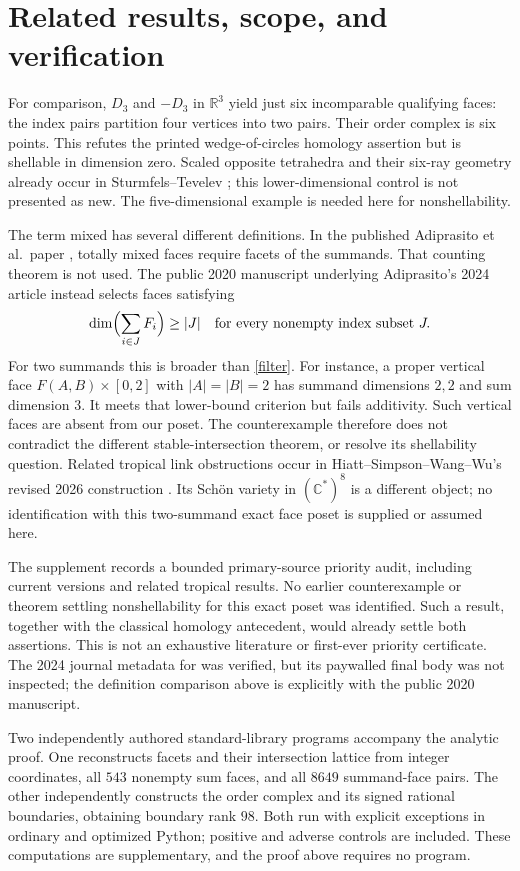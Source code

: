 \documentclass[11pt]{article}
\newcommand{\R}{\mathbb R}
\newcommand{\dimn}{\operatorname{dim}}
\begin{document}
\section{Related results, scope, and verification}
For comparison, $D_3$ and $-D_3$ in $\R^3$ yield just six incomparable
qualifying faces: the index pairs partition four vertices into two
pairs. Their order complex is six points. This refutes the printed
wedge-of-circles homology assertion but is shellable in dimension zero.
Scaled opposite tetrahedra and their six-ray geometry already occur
in Sturmfels--Tevelev \cite[Examples~1.3 and 4.10]{ST}; this lower-dimensional control is not presented as new.
The five-dimensional example is needed here for nonshellability.

The term mixed has several different definitions. In the published
Adiprasito et al.\ paper \cite[Section~1.2]{AB}, totally mixed faces
require facets of the summands. That counting theorem is not used.
The public 2020 manuscript underlying Adiprasito's 2024 article
\cite[p.~2, Corollary~1.3 of the public manuscript]{A} instead selects
faces satisfying
\[
 \dimn\Bigl(\sum_{i\in J}F_i\Bigr)\ge |J|
 \quad\text{for every nonempty index subset }J.
\]
For two summands this is broader than \eqref{filter}.
For instance, a proper vertical face $F(A,B)\times[0,2]$ with
$|A|=|B|=2$ has summand dimensions $2,2$ and sum dimension $3$.
It meets that lower-bound criterion but fails additivity. Such
vertical faces are absent from our poset. The counterexample therefore
does not contradict the different stable-intersection theorem, or
resolve its shellability question.
Related tropical link obstructions occur in Hiatt--Simpson--Wang--Wu's
revised 2026 construction \cite[Section~8]{HSWW}. Its Sch\"on variety
in $(\mathbb C^*)^8$ is a different object; no identification with
this two-summand exact face poset is supplied or assumed here.

The supplement records a bounded primary-source priority audit,
including current versions and related tropical results. No earlier counterexample or theorem settling nonshellability for
this exact poset was identified. Such a result, together with the
classical homology antecedent, would already settle both assertions. This is not an exhaustive
literature or first-ever priority certificate. The 2024 journal
metadata for \cite{A} was verified, but its paywalled final body was
not inspected; the definition comparison above is explicitly with
the public 2020 manuscript.

Two independently authored standard-library programs accompany the
analytic proof. One reconstructs facets and their intersection lattice
from integer coordinates, all $543$ nonempty sum faces, and all $8649$
summand-face pairs. The other independently constructs the order complex
and its signed rational boundaries, obtaining boundary rank $98$.
Both run with explicit exceptions in ordinary and optimized Python;
positive and adverse controls are included. These computations are
supplementary, and the proof above requires no program.
\end{document}
